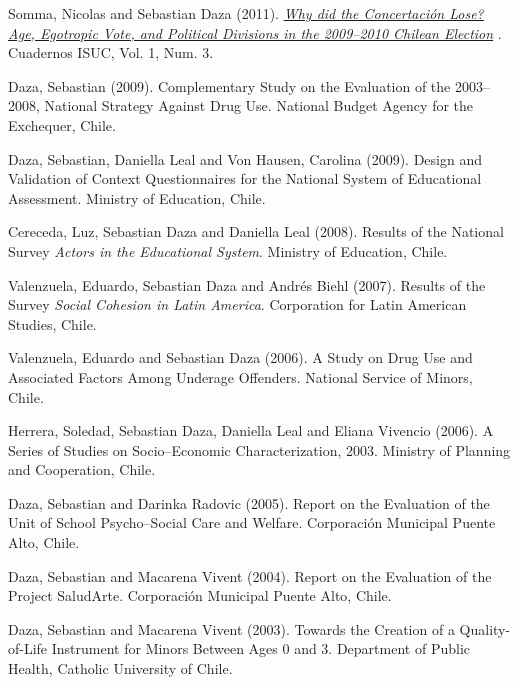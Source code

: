 \documentclass[10pt,letterpaper]{article}
\renewenvironment{itemize}{
  \begin{list}{}{
    \setlength{\leftmargin}{1.5em}
    \setlength{\itemsep}{0.25em}
    \setlength{\parskip}{0pt}
    \setlength{\parsep}{0.25em}
  }
}{
  \end{list}
}
\begin{document}
\begin{itemize}

\item Somma, Nicolas and Sebastian Daza (2011).
  \textit{
  \href{https://sdaza.com/assets/pdf/articulo-nicolas-somma.pdf}
  {Why did the Concertación Lose? Age, Egotropic Vote, and Political Divisions in the 2009--2010 Chilean Election}
  }.
  Cuadernos ISUC, Vol. 1, Num. 3.

\item Daza, Sebastian (2009). Complementary Study on the Evaluation of the 2003--2008, National Strategy Against Drug Use. National Budget Agency for the Exchequer, Chile.

\item Daza, Sebastian, Daniella Leal and Von Hausen, Carolina (2009). Design and Validation of Context Questionnaires for the National System of Educational Assessment. Ministry of Education, Chile.

\item Cereceda, Luz, Sebastian Daza and Daniella Leal (2008). Results of the National Survey \textit{Actors in the Educational System}. Ministry of Education, Chile.

\item Valenzuela, Eduardo, Sebastian Daza and Andrés Biehl (2007). Results of the Survey \textit{Social Cohesion in Latin America}. Corporation for Latin American Studies, Chile.

\item Valenzuela, Eduardo and Sebastian Daza (2006). A Study on Drug Use and Associated Factors Among Underage Offenders. National Service of Minors, Chile.

\item Herrera, Soledad, Sebastian Daza, Daniella Leal and Eliana Vivencio (2006). A Series of Studies on Socio--Economic Characterization, 2003. Ministry of Planning and Cooperation, Chile.

\item Daza, Sebastian and Darinka Radovic (2005). Report on the Evaluation of the Unit of School Psycho--Social Care and Welfare. Corporación Municipal Puente Alto, Chile.

\item Daza, Sebastian and  Macarena Vivent (2004). Report on the Evaluation of the Project SaludArte. Corporación Municipal Puente Alto, Chile.

\item Daza, Sebastian and Macarena Vivent (2003). Towards the Creation of a Quality-of-Life Instrument for Minors Between Ages 0 and 3. Department of Public Health, Catholic University of Chile.


\end{itemize}
\end{document}
